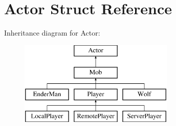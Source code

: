 \hypertarget{struct_actor}{}\section{Actor Struct Reference}
\label{struct_actor}
Inheritance diagram for Actor\+:\begin{figure}[H]
\begin{center}
\leavevmode
\includegraphics[height=4.000000cm]{struct_actor}
\end{center}
\end{figure}
